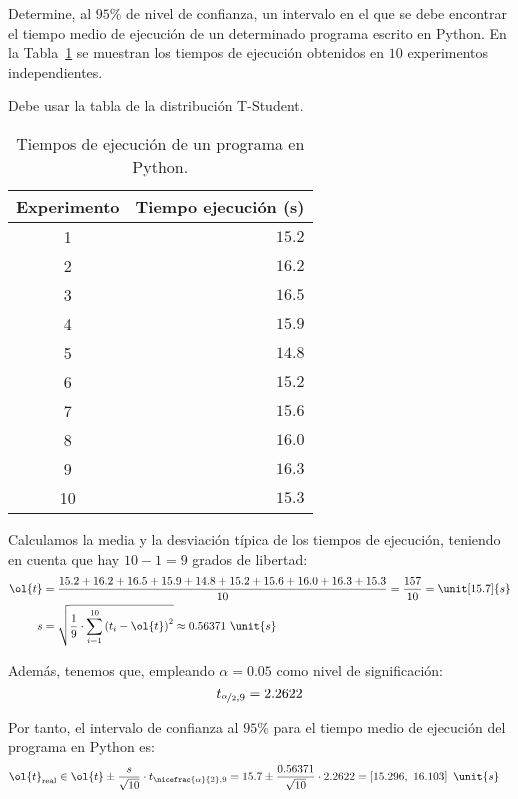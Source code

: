 \begin{ejercicio}\label{ej:4.19}
Determine, al $95\%$ de nivel de confianza, un intervalo en el que se debe encontrar el tiempo medio de ejecución de un determinado programa escrito en Python. En la Tabla~\ref{tab:ej:4.19} se muestran los tiempos de ejecución obtenidos en $10$ experimentos independientes.
\begin{observacion}
    Debe usar la tabla de la distribución T-Student.
\end{observacion}
\begin{table}[h]
\centering
\begin{tabular}{@{}cr@{}}
\toprule
Experimento & Tiempo ejecución (s) \\ \midrule
1 & $15.2$ \\
2 & $16.2$ \\
3 & $16.5$ \\
4 & $15.9$ \\
5 & $14.8$ \\
6 & $15.2$ \\
7 & $15.6$ \\
8 & $16.0$ \\
9 & $16.3$ \\
10 & $15.3$ \\ \bottomrule
\end{tabular}
\caption{Tiempos de ejecución de un programa en Python.}
\label{tab:ej:4.19}
\end{table}

Calculamos la media y la desviación típica de los tiempos de ejecución, teniendo en cuenta que hay $10-1=9$ grados de libertad:
\begin{align*}
    \ol{t} &= \dfrac{15.2 + 16.2 + 16.5 + 15.9 + 14.8 + 15.2 + 15.6 + 16.0 + 16.3 + 15.3}{10} = \dfrac{157}{10} = \unit[15.7]{s}\\
    s &= \sqrt{\dfrac{1}{9}\cdot \sum_{i=1}^{10} \left(t_i-\ol{t}\right)^2} \approx 0.56371\ \unit{s}
\end{align*}

Además, tenemos que, empleando $\alpha=0.05$ como nivel de significación:
\begin{equation*}
    t_{\nicefrac{\alpha}{2},9} = 2.2622
\end{equation*}

Por tanto, el intervalo de confianza al $95\%$ para el tiempo medio de ejecución del programa en Python es:
\begin{align*}
    \ol{t}_{\text{real}}\in \ol{t}\pm \frac{s}{\sqrt{10}}\cdot t_{\nicefrac{\alpha}{2},9} &= 15.7\pm \frac{0.56371}{\sqrt{10}}\cdot 2.2622 = \left[15.296,\ 16.103\right]\ \unit{s}
\end{align*}
\end{ejercicio}
\begin{comment}Sol:
El intervalo de confianza al $95\%$ para el tiempo medio de ejecución del programa en Python es $[15.3, 16.1]$ segundos.
\end{comment}